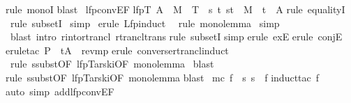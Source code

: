 \begin{isabellebody}
rule\ monoI{\isacharparenright}\isanewline
{}blast{\isacharparenright}\isanewline
\isanewline
{}\ lfp{\isacharunderscore}conv{\isacharunderscore}EF{\isacharcolon}\isanewline
{\isachardoublequote}lfp{\isacharparenleft}{\isasymlambda}T{\isachardot}\ A\ {\isasymunion}\ M{\isacharcircum}{\isacharminus}\ {\isacharcircum}{\isacharcircum}\ T{\isacharparenright}\ {\isacharequal}\ {\isacharbraceleft}s{\isachardot}\ {\isasymexists}t{\isachardot}\ {\isacharparenleft}s{\isacharcomma}t{\isacharparenright}\ {\isasymin}\ M{\isacharcircum}{\isacharasterisk}\ {\isasymand}\ t\ {\isasymin}\ A{\isacharbraceright}{\isachardoublequote}\isanewline
{}rule\ equalityI{\isacharparenright}\isanewline
\ rule\ subsetI{\isacharparenright}\isanewline
\ simp{\isacharparenright}\isanewline
\ erule\ Lfp{\isachardot}induct{\isacharparenright}\isanewline
\ \ rule\ mono{\isacharunderscore}lemma{\isacharparenright}\isanewline
\ simp{\isacharparenright}\isanewline
\ blast\ intro{\isacharcolon}\ r{\isacharunderscore}into{\isacharunderscore}rtrancl\ rtrancl{\isacharunderscore}trans{\isacharparenright}\isanewline
{}rule\ subsetI{\isacharparenright}\isanewline
{}simp{\isacharparenright}\isanewline
{}erule\ exE{\isacharparenright}\isanewline
{}erule\ conjE{\isacharparenright}\isanewline
{}erule{\isacharunderscore}tac\ P\ {\isacharequal}\ {\isachardoublequote}t{\isasymin}A{\isachardoublequote}\ \ rev{\isacharunderscore}mp{\isacharparenright}\isanewline
{}erule\ converse{\isacharunderscore}rtrancl{\isacharunderscore}induct{\isacharparenright}\isanewline
\ rule\ ssubst{\isacharbrackleft}OF\ lfp{\isacharunderscore}Tarski{\isacharbrackleft}OF\ mono{\isacharunderscore}lemma{\isacharbrackright}{\isacharbrackright}{\isacharparenright}\isanewline
\ blast{\isacharparenright}\isanewline
{}rule\ ssubst{\isacharbrackleft}OF\ lfp{\isacharunderscore}Tarski{\isacharbrackleft}OF\ mono{\isacharunderscore}lemma{\isacharbrackright}{\isacharbrackright}{\isacharparenright}\isanewline
{}blast{\isacharparenright}\isanewline
\isanewline
{}\ {\isachardoublequote}mc\ f\ {\isacharequal}\ {\isacharbraceleft}s{\isachardot}\ s\ {\isasymTurnstile}\ f{\isacharbraceright}{\isachardoublequote}\isanewline
{}induct{\isacharunderscore}tac\ f{\isacharparenright}\isanewline
{}auto\ simp\ add{\isacharcolon}lfp{\isacharunderscore}conv{\isacharunderscore}EF{\isacharparenright}\end{isabellebody}%
